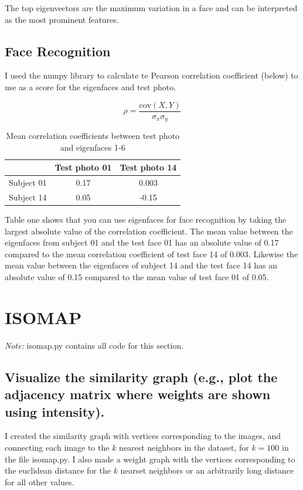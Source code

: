 \documentclass[a4paper]{article}
\begin{document}
The top eigenvectors are the maximum variation in a face and can be interpreted as the most prominent features.   

\subsection{Face Recognition}

I used the numpy library to calculate te Pearson correlation coefficient (below) to use as a score for the eigenfaces and test photo.

$$\rho = \frac{\text{cov}(X,Y)}{\sigma_x \sigma_y}$$

\begin{table}[ht]
\centering
\caption{Mean correlation coefficients between test photo and eigenfaces 1-6}
\begin{tabular}[t]{lcc}
\toprule
&Test photo 01&Test photo 14\\
\midrule
Subject 01&0.17&0.003\\
Subject 14&0.05&-0.15\\
\bottomrule
\end{tabular}
\end{table}%


Table one shows that you can use eigenfaces for face recognition by taking the largest absolute value of the correlation coefficient.  The mean value between the eigenfaces from subject 01 and the test face 01 has an absolute value of 0.17 compared to the mean correlation coefficient of test face 14 of 0.003.  Likewise the mean value between the eigenfaces of subject 14 and the test face 14 has an absolute value of 0.15 compared to the mean value of test face 01 of 0.05.

\section{ISOMAP}
\textit{Note:} isomap.py contains all code for this section.


\subsection{Visualize the similarity graph (e.g., plot the adjacency matrix where weights are shown using intensity).}

I created the similarity graph with vertices corresponding to the images, and connecting each image to the $k$ nearest neighbors in the dataset, for $k = 100$ in the file isomap.py.  I also made a weight graph with the vertices corresponding to the euclidean distance for the $k$ nearset neighbors or an arbitrarily long distance for all other values. 
\end{document}
